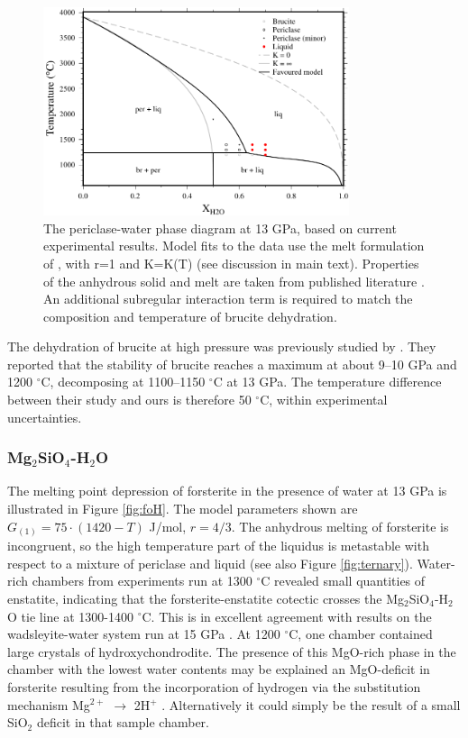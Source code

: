 \documentclass[review]{elsarticle}
\begin{document}
\begin{figure}[ht!]
  \centering
      \includegraphics[width=0.8\textwidth]{figures/periclase}
  \caption{The periclase-water phase diagram at 13 GPa, based on current experimental results. Model fits to the data use the melt formulation of \cite{SS1985}, with r=1 and K=K(T) (see discussion in main text). Properties of the anhydrous solid and melt are taken from published literature \citep{SLB2011, DKS2013}. An additional subregular interaction term is required to match the composition and temperature of brucite dehydration.}
  \label{fig:MH}
\end{figure}



The dehydration of brucite at high pressure was previously studied by \cite{FIYKFO2005}. They reported that the stability of brucite reaches a maximum at about 9--10 GPa and 1200 $^{\circ}$C, decomposing at 1100--1150 $^{\circ}$C at 13 GPa. The temperature difference between their study and ours is therefore 50 $^{\circ}$C, within experimental uncertainties. 


\clearpage
\subsubsection{Mg$_2$SiO$_4$-H$_2$O}
The melting point depression of forsterite in the presence of water at 13 GPa is illustrated in Figure \ref{fig:foH}. The model parameters shown are $G_{(1)} = 75 \cdot (1420-T)$ J/mol, $r=4/3$. The anhydrous melting of forsterite is incongruent, so the high temperature part of the liquidus is metastable with respect to a mixture of periclase and liquid (see also Figure \ref{fig:ternary}). Water-rich chambers from experiments run at 1300 $^{\circ}$C revealed small quantities of enstatite, indicating that the forsterite-enstatite cotectic crosses the Mg$_2$SiO$_4$-H$_2$O tie line at 1300-1400 $^{\circ}$C. This is in excellent agreement with results on the wadsleyite-water system run at 15 GPa \citep{DDFK2005, LSOK2011}. At 1200 $^{\circ}$C, one chamber contained large crystals of hydroxychondrodite. The presence of this MgO-rich phase in the chamber with the lowest water contents may be explained an MgO-deficit in forsterite resulting from the incorporation of hydrogen via the substitution mechanism Mg$^{2+}$ $\rightarrow$ 2H$^+$ \citep{KB2006}. Alternatively it could simply be the result of a small SiO$_2$ deficit in that sample chamber. 
\end{document}

